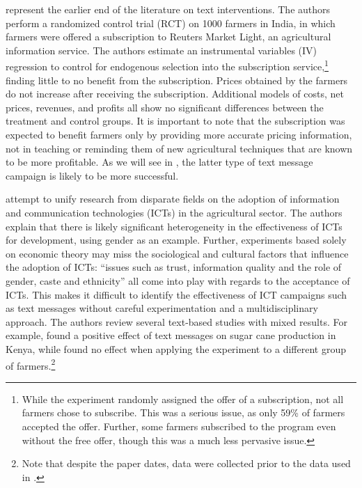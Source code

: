 \documentclass[12pt]{article}
\begin{document}
\textcite{fafchamps_impact_2012} represent the earlier end of the literature on text interventions. The authors perform a randomized control trial (RCT) on 1000 farmers in India, in which farmers were offered a subscription to Reuters Market Light, an agricultural information service. The authors estimate an instrumental variables (IV) regression to control for endogenous selection into the subscription service,\footnote{While the experiment randomly assigned the offer of a subscription, not all farmers chose to subscribe. This was a serious issue, as only 59\% of farmers accepted the offer. Further, some farmers subscribed to the program even without the free offer, though this was a much less pervasive issue.} finding little to no benefit from the subscription. Prices obtained by the farmers do not increase after receiving the subscription. Additional models of costs, net prices, revenues, and profits all show no significant differences between the treatment and control groups. It is important to note that the subscription was expected to benefit farmers only by providing more accurate pricing information, not in teaching or reminding them of new agricultural techniques that are known to be more profitable. As we will see in \textcite{fabregas_digital_2025}, the latter type of text message campaign is likely to be more successful.

\textcite{aker_promise_2016} attempt to unify research from disparate fields on the adoption of information and communication technologies (ICTs) in the agricultural sector. The authors explain that there is likely significant heterogeneity in the effectiveness of ICTs for development, using gender as an example. Further, experiments based solely on economic theory may miss the sociological and cultural factors that influence the adoption of ICTs: ``issues such as trust, information quality and the role of gender, caste and ethnicity'' all come into play with regards to the acceptance of ICTs. This makes it difficult to identify the effectiveness of ICT campaigns such as text messages without careful experimentation and a multidisciplinary approach. The authors review several text-based studies with mixed results. For example, \textcite{casaburi_harnessing_2019} found a positive effect of text messages on sugar cane production in Kenya, while \textcite{casaburi_management_2016} found no effect when applying the experiment to a different group of farmers.\footnote{Note that despite the paper dates, \textcite{casaburi_harnessing_2019} data were collected prior to the data used in \textcite{casaburi_management_2016}.}
\end{document}
